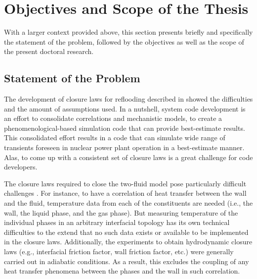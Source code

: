 \section{Objectives and Scope of the Thesis}\label{sec:intro_objectives_and_scope}

With a larger context provided above,
this section presents briefly and specifically the statement of the problem,
followed by the objectives as well as the scope of the present doctoral research.

\subsection{Statement of the Problem}\label{sub:intro_statement_of_problem}

The development of closure laws for reflooding described in \cite{Nelson1992,USNRC2012} showed the difficulties and the amount of assumptions used.
In a nutshell, system code development is an effort to consolidate correlations and mechanistic models, to create a phenomenological-based simulation code that can provide best-estimate results.
This consolidated effort results in a code that can simulate wide range of transients foreseen in nuclear power plant operation in a best-estimate manner.
Alas, to come up with a consistent set of closure laws is a great challenge for code developers.

The closure laws required to close the two-fluid model pose particularly difficult challenges \cite{Wulff2007}.
For instance, to have a correlation of heat transfer between the wall and the fluid, temperature data from each of the constituents are needed (i.e., the wall, the liquid phase, and the gas phase).
But measuring temperature of the individual phases in an arbitrary interfacial topology has its own technical difficulties to the extend that no such data exists or available to be implemented in the closure laws.
Additionally, the experiments to obtain hydrodynamic closure laws (e.g., interfacial friction factor, wall friction factor, etc.) were generally carried out in adiabatic conditions.
As a result, this excludes the coupling of any heat transfer phenomena between the phases and the wall in such correlation.

